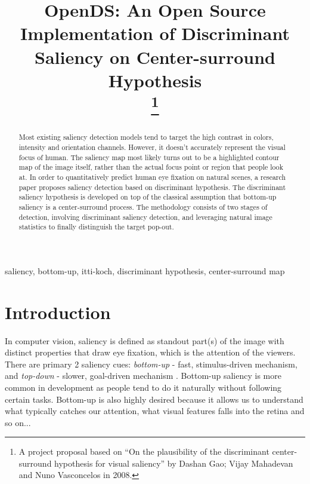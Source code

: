 \documentclass[conference]{IEEEtran}
\begin{document}
\title{OpenDS: An Open Source Implementation of Discriminant Saliency on Center-surround Hypothesis\\
\thanks{A project proposal based on “On the plausibility of the discriminant center-surround hypothesis for visual saliency” by Dashan Gao; Vijay Mahadevan and Nuno Vasconcelos in 2008.}
}

\author{
}

\maketitle

\begin{abstract}
Most existing saliency detection models tend to target the high contrast in colors, intensity and orientation channels. However, it doesn’t accurately represent the visual focus of human. The saliency map most likely turns out to be a highlighted contour map of the image itself, rather than the actual focus point or region that people look at. In order to quantitatively predict human eye fixation on natural scenes, a research paper proposes saliency detection based on discriminant hypothesis. The discriminant saliency hypothesis is developed on top of the classical assumption that bottom-up saliency is a center-surround process. The methodology consists of two stages of detection, involving discriminant saliency detection, and leveraging natural image statistics to finally distinguish the target pop-out.
\end{abstract}

\begin{IEEEkeywords}
saliency, bottom-up, itti-koch, discriminant hypothesis, center-surround map
\end{IEEEkeywords}

\section{Introduction}
In computer vision, saliency is defined as standout part(s) of the image with distinct properties that draw eye fixation, which is the attention of the viewers. There are primary 2 saliency cues: \textit{bottom-up} - fast, stimulus-driven mechanism, and \textit{top-down} - slower, goal-driven mechanism \cite{Gao_Vasconcelos_2007}. Bottom-up saliency is more common in development as people tend to do it naturally without following certain tasks. Bottom-up is also highly desired because it allows us to understand what typically catches our attention, what visual features falls into the retina and so on...
\end{document}
